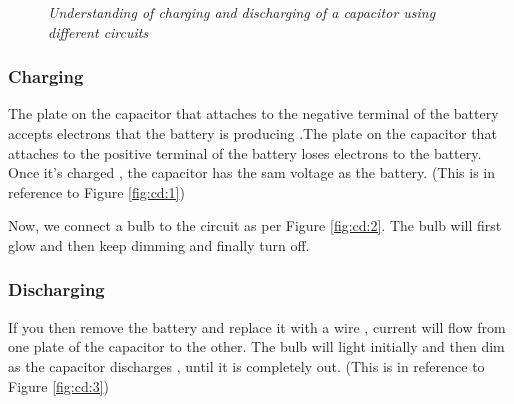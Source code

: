 			\begin{figure}[ht]
				\centering 
				\hfill
				\hfill
				\caption{\textit{Understanding of charging and discharging of a capacitor using different circuits}}
			\end{figure}				
			
			\subsubsection{Charging}					
				The plate on the capacitor that attaches to the negative terminal of the battery accepts electrons that the battery is producing .The plate on the capacitor that attaches to the positive terminal of the battery loses electrons to the battery. Once it’s charged , the capacitor has the sam voltage as the battery. (This is in reference to Figure \ref{fig:cd:1})
				
				Now, we connect a bulb to the circuit as per Figure \ref{fig:cd:2}. The bulb will first glow and then keep dimming and finally turn off.
				
			\subsubsection{Discharging}
				If you then remove the battery and replace it with a wire , current will flow from one plate of the capacitor to the other. The bulb will light initially and then dim as the capacitor discharges , until it is completely out. (This is in reference to Figure \ref{fig:cd:3})

